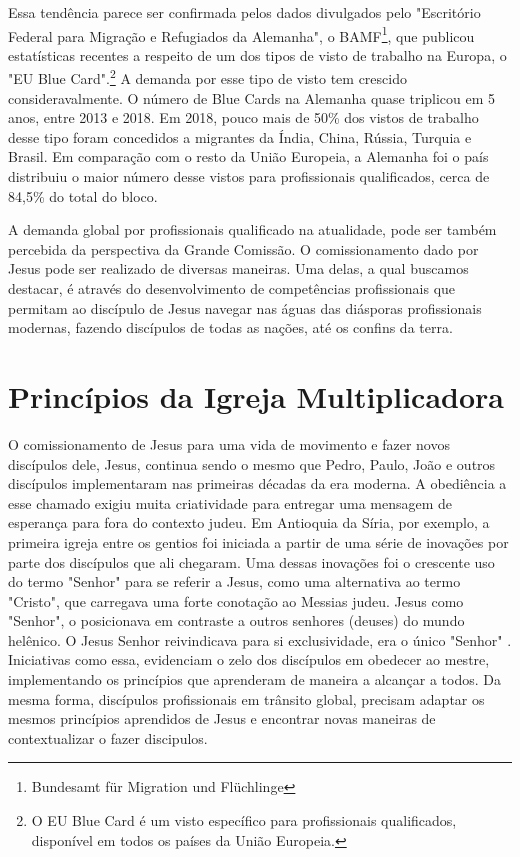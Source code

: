 \documentclass[12pt]{abntex2}
\begin{document}
Essa tendência parece ser confirmada pelos dados divulgados pelo "Escritório Federal para Migração e Refugiados da Alemanha", o BAMF\footnote{Bundesamt für Migration und Flüchlinge}, que publicou estatísticas recentes a respeito de um dos tipos de visto de trabalho na Europa, o "EU Blue Card".\footnote{O EU Blue Card é um visto específico para profissionais qualificados, disponível em todos os países da União Europeia.} A demanda por esse tipo de visto tem crescido consideravalmente. O número de Blue Cards na Alemanha quase triplicou em 5 anos, entre 2013 e 2018. Em 2018, pouco mais de 50\% dos vistos de trabalho desse tipo foram concedidos a migrantes da Índia, China, Rússia, Turquia e Brasil. Em comparação com o resto da União Europeia, a Alemanha foi o país distribuiu o maior número desse vistos para profissionais qualificados, cerca de 84,5\% do total do bloco\cite{bamf}.

A demanda global por profissionais qualificado na atualidade, pode ser também percebida da perspectiva da Grande Comissão. O comissionamento dado por Jesus pode ser realizado de diversas maneiras. Uma delas, a qual buscamos destacar, é através do desenvolvimento de competências profissionais que permitam ao discípulo de Jesus navegar nas águas das diásporas profissionais modernas, fazendo discípulos de todas as nações, até os confins da terra.

\chapter{Princípios da Igreja Multiplicadora}

O comissionamento de Jesus para uma vida de movimento e fazer novos discípulos dele, Jesus, continua sendo o mesmo que Pedro, Paulo, João e outros discípulos implementaram nas primeiras décadas da era moderna. A obediência a esse chamado exigiu muita criatividade para entregar uma mensagem de esperança para fora do contexto judeu. Em Antioquia da Síria, por exemplo, a primeira igreja entre os gentios foi iniciada a partir de uma série de inovações por parte dos discípulos que ali chegaram. Uma dessas inovações foi o crescente uso do termo "Senhor" para se referir a Jesus, como uma alternativa ao termo "Cristo", que carregava uma forte conotação ao Messias judeu. Jesus como "Senhor", o posicionava em contraste a outros senhores (deuses) do mundo helênico. O Jesus Senhor reivindicava para si exclusividade, era o único "Senhor" \cite[p. 170]{green}. Iniciativas como essa, evidenciam o zelo dos discípulos em obedecer ao mestre, implementando os princípios que aprenderam de maneira a alcançar a todos. Da mesma forma, discípulos profissionais em trânsito global, precisam adaptar os mesmos princípios aprendidos de Jesus e encontrar novas maneiras de contextualizar o fazer discipulos.
\end{document}
